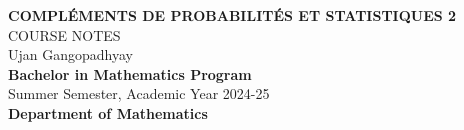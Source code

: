 \documentclass[11pt]{report}
\begin{document}
\pagestyle{plain}

\begin{titlepage}
    \centering
    \vspace*{1cm}


    \MakeUppercase{\Large \textbf{Compl\'ements de probabilit\'es et statistiques 2}}\\[1.5ex]
    \MakeUppercase{\LARGE Course Notes}\\[2cm]


    {\Large Ujan Gangopadhyay}\\[5cm]

\textbf{    {\Large Bachelor in Mathematics Program}\\[2cm]
}
    {\Large Summer Semester, Academic Year 2024-25}\\[1cm]

\textbf{    {\Large Department of Mathematics}\\[3cm]
}
\end{titlepage}

\newpage
\tableofcontents

\pagestyle{fancy}





% 




\appendix

\newpage



\end{document}
